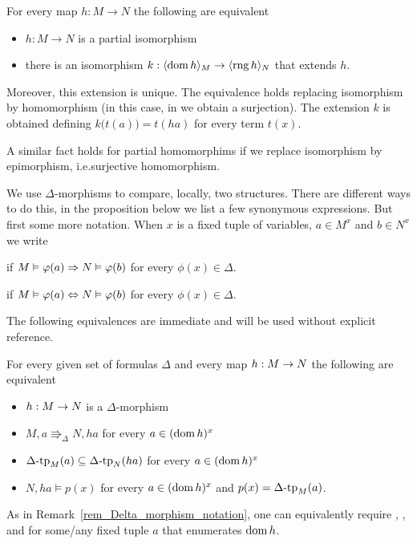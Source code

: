 \begin{remark}\label{rem_extension_homo}
For every map  $h:M\to N$ the following are equivalent
\begin{itemize}
\item[1.] $h:M\to N$ is a partial isomorphism
\item[2.] there is an isomorphism $k:\langle\mathop{\rm dom} h\rangle_M\to\langle\mathop{\rm rng} h\rangle_N$ that extends $h$.
\end{itemize}
\smallskip
Moreover, this extension is unique.
The equivalence holds replacing isomorphism by homomorphism 
(in this case, in  we obtain a surjection).
The extension $k$ is obtained defining $k\big(t(a)\big)=t(ha)$ for every term $t(x)$.

A similar fact holds for partial homomorphims if we replace isomorphism by epimorphism, i.e.\@ surjective homomorphism.
\end{remark}

We use $\Delta$-morphisms to compare, locally, two structures.
There are different ways to do this, in the proposition below we list a few synonymous expressions.
But first some more notation.
When $x$ is a fixed tuple of variables, $a\in M^{x}$ and $b\in N^{x}$ we write

\hfill if $M\vDash\varphi(a)\Rightarrow N\vDash\varphi(b)$ for every $\phi(x)\in\Delta$.

\hfill if $M\vDash\varphi(a)\Leftrightarrow N\vDash\varphi(b)$ for every $\phi(x)\in\Delta$.

The following equivalences are immediate and will be used without explicit reference.

\begin{proposition}\label{oss_Delta-morfismi}
For every given set of formulas $\Delta$ and every map $h:M\rightarrow N$ the following are equivalent
\begin{itemize}
\item[1.] $h:M\rightarrow N$ is a $\Delta$-morphism
\item[2.] $M,a\Rrightarrow_\Delta N,ha$ for every $a\in(\mathop{\rm dom} h)^{x}$
\item[3.] $\Delta\mbox{\rm -tp}_M(a)\subseteq\Delta\mbox{\rm -tp}_N(ha)$ for every $a\in(\mathop{\rm dom} h)^{x}$
\item[4.] $N,ha\models p(x)$ for every $a\in(\mathop{\rm dom} h)^{x}$ and $p(x)=\Delta\mbox{\rm -tp}_M(a)$.
\end{itemize}
\end{proposition}

As in Remark~\ref{rem_Delta_morphism_notation}, one can equivalently require , , and  for some/any fixed tuple $a$ that enumerates $\mathop{\rm dom} h$. 

